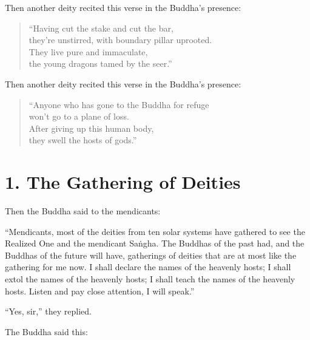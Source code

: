 \documentclass[12pt,openany]{book}%
\begin{document}
Then another deity recited this verse in the Buddha’s presence: 

\begin{verse}%
“Having cut the stake and cut the bar, \\
they’re unstirred, with boundary pillar uprooted. \\
They live pure and immaculate, \\
the young dragons tamed by the seer.” 

%
\end{verse}

Then another deity recited this verse in the Buddha’s presence: 

\begin{verse}%
“Anyone who has gone to the Buddha for refuge \\
won’t go to a plane of loss. \\
After giving up this human body, \\
they swell the hosts of gods.” 

%
\end{verse}

\section*{1. The Gathering of Deities }

Then the Buddha said to the mendicants: 

“Mendicants, most of the deities from ten solar systems have gathered to see the Realized One and the mendicant \textsanskrit{Saṅgha}. The Buddhas of the past had, and the Buddhas of the future will have, gatherings of deities that are at most like the gathering for me now. I shall declare the names of the heavenly hosts; I shall extol the names of the heavenly hosts; I shall teach the names of the heavenly hosts. Listen and pay close attention, I will speak.” 

“Yes, sir,” they replied. 

The Buddha said this: 
\end{document}
